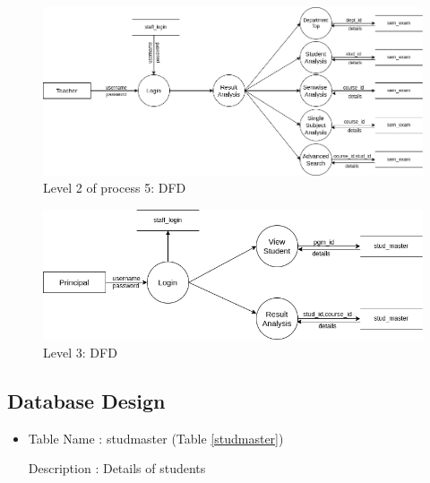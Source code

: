 \documentclass{nascproject}
\begin{document}
\begin{figure}[H]
	\centering
	\includegraphics[scale=0.4]{level_teacher1.1.png}
	\caption{Level 2 of process 5: DFD}
	\label{level_teacher 2}
\end{figure}

\begin{figure}[H]
	\centering
	\includegraphics[scale=0.4]{level_principal.png}
        \caption{Level 3: DFD}
	\label{level_prin}
\end{figure}

\subsection{Database Design}

\begin{itemize}
	\item Table Name : stud\textunderscore master (Table \ref{studmaster})
	
	Description : Details of students
\end{itemize}
\end{document}
